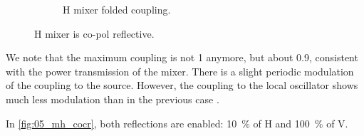 \begin{figure}[hbtp]
\begin{subfigure}[b]{.5\textwidth}
        \caption{H mixer folded coupling.}
    \end{subfigure}%
    \caption{H mixer is co-pol reflective.}
    \label{fig:04_mh_co}
\end{figure}

We note that the maximum coupling is not 1 anymore, but about 0.9, consistent with the power transmission of the mixer.
There is a slight periodic modulation of the coupling to the source.
However, the coupling to the local oscillator shows much less modulation than in the previous case .

In \cref{fig:05_mh_cocr}, both reflections are enabled: \SI{10}{\percent} of H and \SI{100}{\percent} of V.

